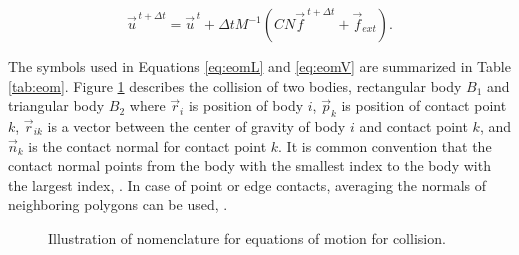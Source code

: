 \begin{equation} \label{eq:eomV}
\vec{u}^{\, t+\Delta t} = \vec{u}^{\, t}+\Delta t M^{-1}(C N \vec{f}^{\ t+\Delta t} + \vec{f}_{ext}) .
\end{equation}

The symbols used in Equations \ref{eq:eomL} and \ref{eq:eomV}
are summarized in Table \ref{tab:eom}.
Figure \ref{fig:eom-contact} describes the collision of two
bodies, rectangular body $B_1$ and triangular body $B_2$
where $\vec{r}_i$ is position of body $i$,
$\vec{p}_k $ is position of contact point $k$,
$\vec{r}_{ik} $ is a vector between the center of gravity of body $i$ and contact point $k$, 
and
$\vec{n}_{k}$ is the contact normal for contact point $k$.
It is common convention that the contact normal points
from the body with the smallest index to the body with the largest index, \cite{erleben.thesis}.
In case of point or edge contacts, averaging the normals of neighboring polygons can be used, \cite{Hahn:1998}.

\begin{figure}[tb!]
\centering
{}
\caption{Illustration of nomenclature for equations of motion for collision.}
\label{fig:eom-contact}
\end{figure}

